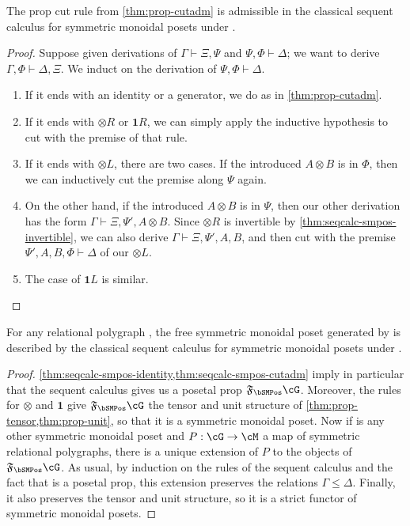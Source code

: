 \documentclass{book}
\let\types\vdash
\newcommand{\F}[1]{\mathfrak{F}_{#1}}
\def\one{\mathbf{1}}
\let\tensor\otimes
\def\tensorL{\mathord{\tensor}L}
\def\tensorR{\mathord{\tensor}R}
\begin{document}
\begin{thm}\label{thm:seqcalc-smpos-cutadm}
  The prop cut rule from \cref{thm:prop-cutadm} is admissible in the classical sequent calculus for symmetric monoidal posets under \cG.
\end{thm}
\begin{proof}
  Suppose given derivations of $\Gamma\types\Xi,\Psi$ and $\Psi,\Phi \types \Delta$; we want to derive $\Gamma,\Phi \types \Delta,\Xi$.
  We induct on the derivation of $\Psi,\Phi \types \Delta$.
  \begin{enumerate}
  \item If it ends with an identity or a generator, we do as in \cref{thm:prop-cutadm}.
  \item If it ends with $\tensorR$ or $\one R$, we can simply apply the inductive hypothesis to cut with the premise of that rule.
  \item If it ends with $\tensorL$, there are two cases.
    If the introduced $A\tensor B$ is in $\Phi$, then we can inductively cut the premise along $\Psi$ again.
  \item On the other hand, if the introduced $A\tensor B$ is in $\Psi$, then our other derivation has the form $\Gamma\types\Xi,\Psi',A\tensor B$.
    Since $\tensorR$ is invertible by \cref{thm:seqcalc-smpos-invertible}, we can also derive $\Gamma\types\Xi,\Psi',A,B$, and then cut with the premise $\Psi',A,B,\Phi \types \Delta$ of our $\tensorL$.
  \item The case of $\one L$ is similar.\qedhere
  \end{enumerate}
\end{proof}

\begin{thm}\label{thm:seqcalc-smpos-initial}
  For any relational polygraph \cG, the free symmetric monoidal poset generated by \cG is described by the classical sequent calculus for symmetric monoidal posets under \cG.
\end{thm}
\begin{proof}
  \cref{thm:seqcalc-smpos-identity,thm:seqcalc-smpos-cutadm} imply in particular that the sequent calculus gives us a posetal prop $\F\bSMPos\cG$.
  Moreover, the rules for $\tensor$ and $\one$ give $\F\bSMPos\cG$ the tensor and unit structure of \cref{thm:prop-tensor,thm:prop-unit}, so that it is a symmetric monoidal poset.
  Now if \cM is any other symmetric monoidal poset and $P:\cG\to\cM$ a map of symmetric relational polygraphs, there is a unique extension of $P$ to the objects of $\F\bSMPos\cG$.
  As usual, by induction on the rules of the sequent calculus and the fact that \cM is a posetal prop, this extension preserves the relations $\Gamma\le\Delta$.
  Finally, it also preserves the tensor and unit structure, so it is a strict functor of symmetric monoidal posets.
\end{proof}
\end{document}
